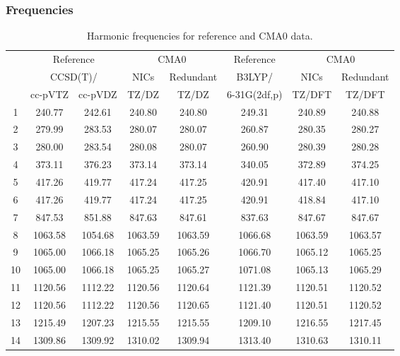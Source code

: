 \documentclass[10pt,oneside]{article}
\begin{document}
\begin{table}[h!]
\subsubsection*{Frequencies}
\centering
\caption{Harmonic frequencies for reference and CMA0 data.}
\begin{tabular}{cccccccc}
\toprule
{} & \multicolumn{2}{c}{Reference} & \multicolumn{2}{c}{CMA0} &    Reference & \multicolumn{2}{c}{CMA0} \\
{} & \multicolumn{2}{c}{CCSD(T)/} &    NICs &  Redundant &       B3LYP/ &    NICs & Redundant \\
{} &   cc-pVTZ & cc-pVDZ &   TZ/DZ &      TZ/DZ & 6-31G(2df,p) &  TZ/DFT &    TZ/DFT \\
\midrule
1  &    240.77 &  242.61 &  240.80 &     240.80 &       249.31 &  240.89 &    240.88 \\
2  &    279.99 &  283.53 &  280.07 &     280.07 &       260.87 &  280.35 &    280.27 \\
3  &    280.00 &  283.54 &  280.08 &     280.07 &       260.90 &  280.39 &    280.28 \\
4  &    373.11 &  376.23 &  373.14 &     373.14 &       340.05 &  372.89 &    374.25 \\
5  &    417.26 &  419.77 &  417.24 &     417.25 &       420.91 &  417.40 &    417.10 \\
6  &    417.26 &  419.77 &  417.24 &     417.25 &       420.91 &  418.84 &    417.10 \\
7  &    847.53 &  851.88 &  847.63 &     847.61 &       837.63 &  847.67 &    847.67 \\
8  &   1063.58 & 1054.68 & 1063.59 &    1063.59 &      1066.68 & 1063.59 &   1063.57 \\
9  &   1065.00 & 1066.18 & 1065.25 &    1065.26 &      1066.70 & 1065.12 &   1065.25 \\
10 &   1065.00 & 1066.18 & 1065.25 &    1065.27 &      1071.08 & 1065.13 &   1065.29 \\
11 &   1120.56 & 1112.22 & 1120.56 &    1120.64 &      1121.39 & 1120.51 &   1120.52 \\
12 &   1120.56 & 1112.22 & 1120.56 &    1120.65 &      1121.40 & 1120.51 &   1120.52 \\
13 &   1215.49 & 1207.23 & 1215.55 &    1215.55 &      1209.10 & 1216.55 &   1217.45 \\
14 &   1309.86 & 1309.92 & 1310.02 &    1309.94 &      1313.40 & 1310.63 &   1310.11 \\

\end{tabular}
\end{table}
\end{document}
